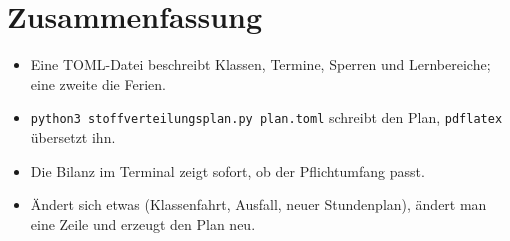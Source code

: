 \section{Zusammenfassung}

\begin{itemize}
	\item Eine TOML-Datei beschreibt Klassen, Termine, Sperren und Lernbereiche; eine zweite die Ferien.
	\item \texttt{python3 stoffverteilungsplan.py plan.toml} schreibt den Plan, \texttt{pdflatex} übersetzt ihn.
	\item Die Bilanz im Terminal zeigt sofort, ob der Pflichtumfang passt.
	\item Ändert sich etwas (Klassenfahrt, Ausfall, neuer Stundenplan), ändert man eine Zeile und erzeugt den Plan neu.
\end{itemize}


